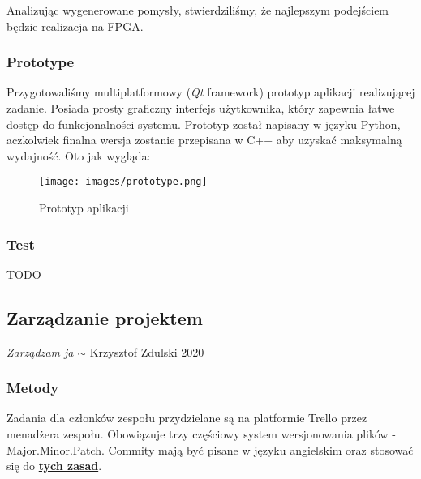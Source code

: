 \documentclass{article}
\begin{document}
Analizując wygenerowane pomysły, stwierdziliśmy, że najlepszym podejściem będzie realizacja na FPGA.

\subsubsection{Prototype}
\label{sec:prototype}

Przygotowaliśmy multiplatformowy (\textit{Qt} framework) prototyp aplikacji realizującej zadanie.
Posiada prosty graficzny
interfejs użytkownika, który zapewnia łatwe dostęp do funkcjonalności systemu.
Prototyp został napisany w języku Python, 
aczkolwiek finalna wersja zostanie przepisana w C++ aby uzyskać maksymalną
wydajność. 
Oto jak wygląda:

\begin{figure}[H]
    \centering
    \texttt{[image: images/prototype.png]}
    \caption{Prototyp aplikacji}
    \label{fig:prototype-1}
\end{figure}

\subsubsection{Test}
\label{sec:test}

TODO

\subsection{Zarządzanie projektem}
\label{sec:zarządzanie_projektem}

\textit{Zarządzam ja} $\sim$ Krzysztof Zdulski 2020

\subsubsection{Metody}
\label{sec:narzędzia}

Zadania dla członków zespołu przydzielane są na platformie Trello przez
menadżera zespołu. 
Obowiązuje trzy częściowy system wersjonowania plików - Major.Minor.Patch.
Commity mają być pisane w języku angielskim oraz stosować się
do \textbf{\href{https://chris.beams.io/posts/git-commit/}{tych zasad}}.
\end{document}
